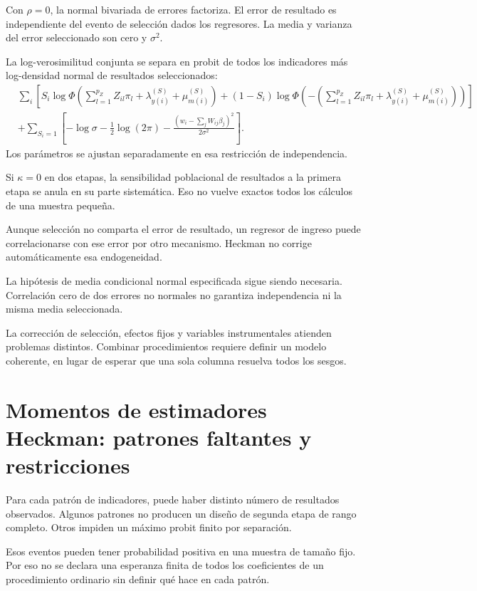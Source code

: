 \documentclass[11pt,a4paper]{article}
\begin{document}
Con \(\rho=0\), la normal
bivariada de errores factoriza.
El error de resultado
es independiente del evento
de selección dados los
regresores.
La media y varianza
del error seleccionado
son cero y \(\sigma^2\).

La log-verosimilitud conjunta
se separa en probit
de todos los indicadores
más log-densidad normal
de resultados seleccionados:
\[
\begin{aligned}
&\sum_i[
S_i\log\Phi(\sum_{l=1}^{p_Z}Z_{il}\pi_l+\lambda_{y(i)}^{(S)}+\mu_{m(i)}^{(S)})
+(1-S_i)\log\Phi(-\left(\sum_{l=1}^{p_Z}Z_{il}\pi_l+\lambda_{y(i)}^{(S)}+\mu_{m(i)}^{(S)}\right))]\\
&+\sum_{S_i=1}
\left[-\log\sigma-\tfrac12\log(2\pi)
-\frac{(w_i-\sum_jW_{ij}\beta_j)^2}{2\sigma^2}\right].
\end{aligned}
\]
Los parámetros se ajustan
separadamente en esa
restricción de independencia.

Si \(\kappa=0\) en
dos etapas, la sensibilidad
poblacional de resultados
a la primera etapa
se anula en su
parte sistemática.
Eso no vuelve exactos
todos los cálculos
de una muestra pequeña.

\begin{ejemplo}
Aunque selección no comparta
el error de resultado,
un regresor de ingreso
puede correlacionarse con
ese error por otro mecanismo.
Heckman no corrige
automáticamente esa endogeneidad.
\end{ejemplo}
La hipótesis de media
condicional normal especificada
sigue siendo necesaria.
Correlación cero de dos
errores no normales no
garantiza independencia ni
la misma media seleccionada.

La corrección de selección,
efectos fijos y variables
instrumentales atienden
problemas distintos.
Combinar procedimientos requiere
definir un modelo coherente,
en lugar de esperar
que una sola columna
resuelva todos los sesgos.


\clearpage
\section{Momentos de estimadores Heckman: patrones faltantes y restricciones}

Para cada patrón de indicadores,
puede haber distinto número
de resultados observados.
Algunos patrones no producen
un diseño de segunda etapa
de rango completo.
Otros impiden un máximo
probit finito por separación.

Esos eventos pueden tener
probabilidad positiva en
una muestra de tamaño fijo.
Por eso no se declara
una esperanza finita
de todos los coeficientes
de un procedimiento ordinario
sin definir qué hace
en cada patrón.
\end{document}
